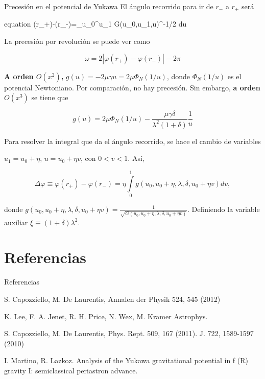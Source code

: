 \documentclass{beamer}
\begin{document}
\begin{frame}[allowframebreaks]{Precesión en el potencial de Yukawa}
	El ángulo recorrido para ir de  $r_-$ a $r_+$ será
	
	\begin{empheq}[box=\tcbhighmath]{equation}
	\varphi(r_+)-\varphi(r_-)=\int\limits_{u_0}^{u_1} G(u_0,u_1,u)^{-1/2} du
	\end{empheq}
	
	La precesión por revolución se puede ver como
	
	\begin{equation}
		\boxed{\omega=2|\varphi(r_+)-\varphi(r_-)| -2\pi}
	\end{equation}
	
	\textbf{A orden $O(x^2)$,} $g(u)=-2\mu\gamma u=2\mu\Phi_N(1/u)$, donde $\Phi_N(1/u)$ es el potencial Newtoniano. Por comparación, no hay precesión. Sin embargo, \textbf{a orden $O(x^3)$} se tiene que 
	
	$$g(u)=2\mu\Phi_N(1/u)-\frac{\mu\gamma\delta}{\lambda^2(1+\delta)}\frac{1}{u}$$
	
	Para resolver la integral que da el ángulo recorrido, se hace el cambio de variables
	
	\begin{center}
		$u_1=u_0+\eta$, $u=u_0+\eta v$, con $0<v<1.$ Así,
	\end{center}

	\begin{equation}
		\Delta \varphi \equiv \varphi(r_+)-\varphi(r_-) = \eta \int\limits_0^1 g(u_0,u_0+\eta,\lambda,\delta,u_0+\eta v) dv,
	\end{equation}
	
	donde $g(u_0,u_0+\eta,\lambda,\delta,u_0+\eta v)=\frac{1}{\sqrt{G(u_0,u_0+\eta,\lambda,\delta,u_0+\eta v)}}.$ Definiendo la variable auxiliar $\xi \equiv (1+\delta)\lambda^2.$
	\end{frame}
	\section{Referencias}
	\begin{frame}[allowframebreaks]{Referencias}
	\begin{thebibliography}{9}
		 S. Capozziello, M. De Laurentis, Annalen der Physik 524, 545 (2012) 
		
		 K. Lee, F. A. Jenet, R. H. Price, N. Wex, M. Kramer Astrophys.
		
		 S. Capozziello, M. De Laurentis, Phys. Rept. 509, 167 (2011).
J. 722, 1589-1597 (2010)

		 I. Martino, R. Lazkoz. Analysis of the Yukawa gravitational potential in f (R) gravity I: semiclassical periastron advance.
	\end{thebibliography}
	\end{frame}
\end{document}
